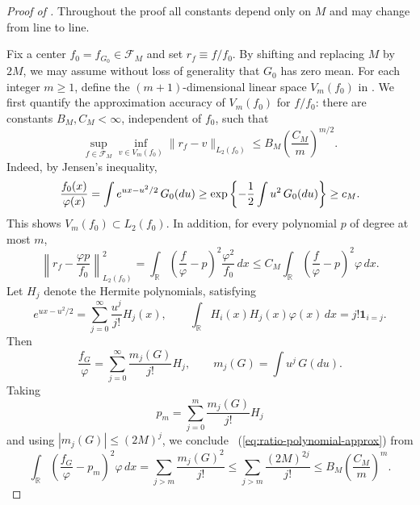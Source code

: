 \documentclass[letterpaper,11pt]{article}
\newcommand{\eqref}[1]{~(\ref{#1})}
\def\exp{\mathop{\rm exp}}
\newcommand{\calF}{{\mathcal{F}}}
\theoremstyle{definition}
\begin{document}
\begin{proof}[Proof of ]
Throughout the proof all constants depend only on $M$ and may change from line
to line.  

Fix a center $f_0=f_{G_0}\in\calF_M$ and set
$r_f\equiv f/f_0$.  By shifting and replacing $M$ by $2M$, we may assume
without loss of generality that $G_0$ has zero mean. For each integer $m\ge1$,
define the $(m+1)$-dimensional linear space $V_m(f_0)$ in .
We first quantify the approximation accuracy of $V_m(f_0)$ for $f/f_0$: there are
constants $B_M,C_M<\infty$, independent of $f_0$, such that
\begin{equation}
\label{eq:ratio-polynomial-approx}
\sup_{f\in\calF_M}\inf_{v\in V_m(f_0)}
\|r_f-v\|_{L_2(f_0)}
\le B_M\left(\frac{C_M}{m}\right)^{m/2}.
\end{equation}
Indeed, by Jensen's inequality,
\[
\frac{f_0(x)}{\varphi(x)}
=\int e^{ux-u^2/2}\,G_0(du)
\ge
\exp\left\{-\frac12\int u^2\,G_0(du)\right\}
\ge c_M.
\]
This shows $V_m(f_0) \subset L_2(f_0)$.
In addition, for every polynomial $p$ of degree
at most $m$,
\[
\left\|r_f-\frac{\varphi p}{f_0}\right\|_{L_2(f_0)}^2
=
\int_{\mathbb R}\left(\frac{f}{\varphi}-p\right)^2
\frac{\varphi^2}{f_0}\,dx
\le
C_M\int_{\mathbb R}\left(\frac{f}{\varphi}-p\right)^2\varphi\,dx .
\]
Let $H_j$ denote the Hermite polynomials, satisfying
\[
e^{ux-u^2/2}
=\sum_{j=0}^{\infty}\frac{u^j}{j!}H_j(x),
\qquad
\int_{\mathbb R}H_i(x) H_j(x)\varphi(x)\,dx=j! \mathbf{1}_{i=j}.
\]
Then
\begin{equation}
\frac{f_G}{\varphi}
=
\sum_{j=0}^{\infty}
\frac{m_j(G)}{j!}H_j,
\qquad
m_j(G)=\int u^j\,G(du).
\label{eq:hermite-exp}
\end{equation}
Taking
\[
p_m=\sum_{j=0}^m\frac{m_j(G)}{j!}H_j
\]
and using $|m_j(G)| \leq (2M)^j$, we conclude \eqref{eq:ratio-polynomial-approx} from
\[
\int_{\mathbb R}\left(\frac{f_G}{\varphi}-p_m\right)^2\varphi\,dx
=
\sum_{j>m}\frac{m_j(G)^2}{j!}
\le
\sum_{j>m}\frac{(2M)^{2j}}{j!}
\le
B_M\left(\frac{C_M}{m}\right)^m.
\]





\end{proof}
\end{document}

